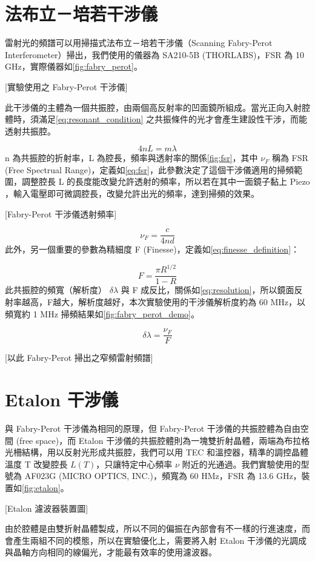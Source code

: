 \documentclass[class=NCU_thesis, crop=false]{standalone}
\begin{document}
\section{法布立－培若干涉儀}
雷射光的頻譜可以用掃描式法布立－培若干涉儀（Scanning Fabry-Perot Interferometer）掃出，我們使用的儀器為 SA210-5B (THORLABS)，FSR 為 10 GHz，實際儀器如\cref{fig:fabry_perot}。

[實驗使用之 Fabry-Perot 干涉儀]

此干涉儀的主體為一個共振腔，由兩個高反射率的凹面鏡所組成。當光正向入射腔體時，須滿足\cref{eq:resonant_condition} 之共振條件的光才會產生建設性干涉，而能透射共振腔。

\begin{equation}
    4nL=m\lambda
    \label{eq:resonant_condition}
\end{equation}
n 為共振腔的折射率，L 為腔長，頻率與透射率的關係\cref{fig:fsr}，其中 $\nu_{F}$ 稱為 FSR (Free Spectrual Range)，定義如\cref{eq:fsr}，此參數決定了這個干涉儀適用的掃頻範圍，調整腔長 L 的長度能改變允許透射的頻率，所以若在其中一面鏡子黏上 Piezo ，輸入電壓即可微調腔長，改變允許出光的頻率，達到掃頻的效果。

[Fabry-Perot 干涉儀透射頻率]

\begin{equation}
    \nu_{F}=\frac{c}{4nd}
    \label{eq:fsr}
\end{equation}
此外，另一個重要的參數為精細度 F (Finesse)，定義如\cref{eq:finesse_definition}：

\begin{equation}
    F=\frac{\pi R^{1/2}}{1-R}
    \label{eq:finesse_definition}
\end{equation}
此共振腔的頻寬（解析度） $\delta \lambda$ 與 F 成反比，關係如\cref{eq:resolution}，所以鏡面反射率越高，F越大，解析度越好，本次實驗使用的干涉儀解析度約為 60 MHz，以頻寬約 1 MHz 掃頻結果如\cref{fig:fabry_perot_demo}。

\begin{equation}
    \delta \lambda=\frac{\nu_{F}}{F}
    \label{eq:resolution}
\end{equation}

[以此 Fabry-Perot 掃出之窄頻雷射頻譜]

\section{Etalon 干涉儀}
與 Fabry-Perot 干涉儀為相同的原理，但 Fabry-Perot 干涉儀的共振腔體為自由空間 (free space)，而 Etalon 干涉儀的共振腔體則為一塊雙折射晶體，兩端為布拉格光柵結構，用以反射光形成共振腔，我們可以用 TEC 和溫控器，精準的調控晶體溫度 T 改變腔長 $L(T)$，只讓特定中心頻率 $\nu$ 附近的光通過。我們實驗使用的型號為 AF023G (MICRO OPTICS, INC.)，頻寬為 60 HMz，FSR 為 13.6 GHz，裝置如\cref{fig:etalon}。

[Etalon 濾波器裝置圖]

由於腔體是由雙折射晶體製成，所以不同的偏振在內部會有不一樣的行進速度，而會產生兩組不同的模態，所以在實驗優化上，需要將入射 Etalon 干涉儀的光調成與晶軸方向相同的線偏光，才能最有效率的使用濾波器。
\end{document}
